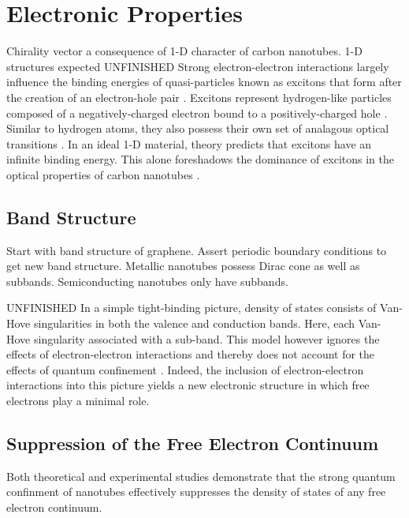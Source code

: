 \section{Electronic Properties}

Chirality vector a consequence of 1-D character of carbon nanotubes. 1-D structures expected 
{\color{red}UNFINISHED} Strong electron-electron interactions largely influence the binding energies of quasi-particles known as excitons that form after the creation of an electron-hole pair \cite{koch2006semiconductor}. Excitons represent hydrogen-like particles composed of a negatively-charged electron bound to a positively-charged hole \cite{koch2006semiconductor}. Similar to hydrogen atoms, they also possess their own set of analagous optical transitions \cite{koch2006semiconductor}. In an ideal 1-D material, theory predicts that excitons have an infinite binding energy. This alone foreshadows the dominance of excitons in the optical properties of carbon nanotubes \cite{ando2005theory}. 

\subsection{Band Structure}

Start with band structure of graphene. Assert periodic boundary conditions to get new band structure. Metallic nanotubes possess Dirac cone as well as subbands. Semiconducting nanotubes only have subbands.


{\color{red}UNFINISHED} In a simple tight-binding picture, density of states consists of Van-Hove singularities in both the valence and conduction bands. Here, each Van-Hove singularity associated with a sub-band. This model however ignores the effects of electron-electron interactions and thereby does not account for the effects of quantum confinement \cite{weismanKonoBook}. Indeed, the inclusion of electron-electron interactions into this picture yields a new electronic structure in which free electrons play a minimal role.

\subsection{Suppression of the Free Electron Continuum}

Both theoretical and experimental studies demonstrate that the strong quantum confinment of nanotubes effectively suppresses the density of states of any free electron continuum.  
 
